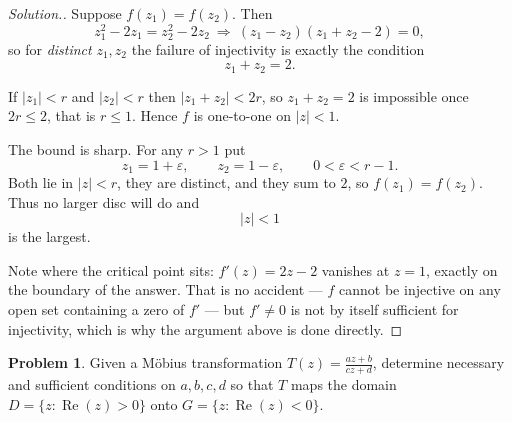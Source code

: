 \documentclass[11pt,a4paper]{article}
\theoremstyle{definition}
\newtheorem{problemx}{Problem}[section]
\newenvironment{problem}{\begin{problemx}}{\end{problemx}}
\newenvironment{solution}
  {\renewcommand{\qedsymbol}{}\begin{proof}[\textit{Solution}.]}
  {\end{proof}}
\begin{document}
\begin{solution}
Suppose $f(z_1) = f(z_2)$. Then
$$z_1^2 - 2z_1 = z_2^2 - 2z_2
\ \Longrightarrow\ (z_1-z_2)(z_1+z_2-2) = 0,$$
so for \emph{distinct} $z_1, z_2$ the failure of injectivity is exactly the
condition
$$z_1 + z_2 = 2 .$$

If $\left|z_1\right| < r$ and $\left|z_2\right| < r$ then
$\left|z_1+z_2\right| < 2r$, so $z_1 + z_2 = 2$ is impossible once $2r \leq 2$,
that is $r \leq 1$. Hence $f$ is one-to-one on $\left|z\right| < 1$.

The bound is sharp. For any $r > 1$ put
$$z_1 = 1 + \varepsilon,\qquad z_2 = 1 - \varepsilon,
\qquad 0 < \varepsilon < r - 1 .$$
Both lie in $\left|z\right| < r$, they are distinct, and they sum to $2$, so
$f(z_1) = f(z_2)$. Thus no larger disc will do and
$$\boxed{\left|z\right| < 1}$$
is the largest.

Note where the critical point sits: $f'(z) = 2z - 2$ vanishes at $z = 1$, exactly
on the boundary of the answer. That is no accident --- $f$ cannot be injective on
any open set containing a zero of $f'$ --- but $f' \neq 0$ is not by itself
sufficient for injectivity, which is why the argument above is done directly.
\end{solution}


\begin{problem}
Given a M\"obius transformation $T(z) = \frac{az + b}{cz + d}$, determine
necessary and sufficient conditions on $a, b, c, d$ so that $T$ maps the domain
$D = \{z : \operatorname{Re}(z) > 0\}$ onto
$G = \{z : \operatorname{Re}(z) < 0\}$.
\end{problem}
\end{document}
